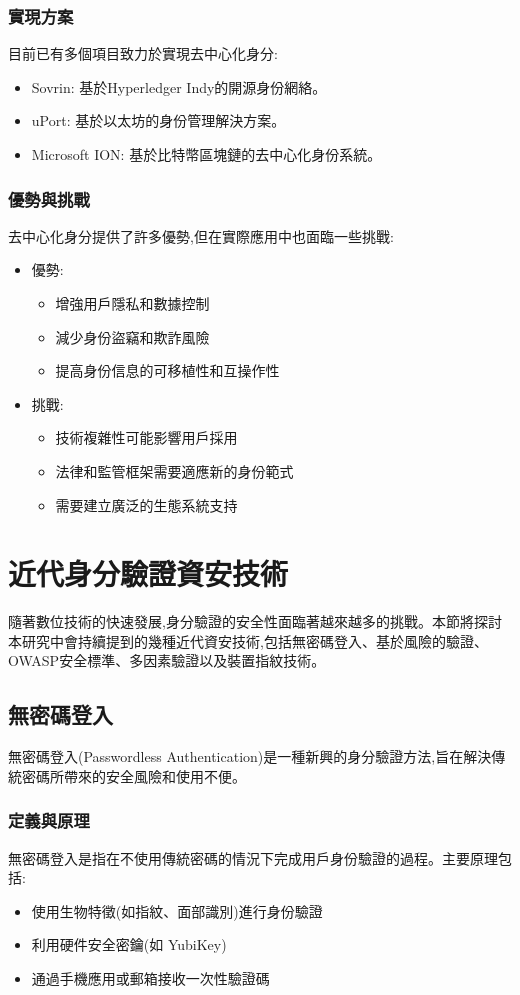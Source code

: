 \subsubsection{實現方案}
目前已有多個項目致力於實現去中心化身分:
\begin{itemize}
  \item Sovrin: 基於Hyperledger Indy的開源身份網絡。
  \item uPort: 基於以太坊的身份管理解決方案。
  \item Microsoft ION: 基於比特幣區塊鏈的去中心化身份系統。
\end{itemize}

\subsubsection{優勢與挑戰}
去中心化身分提供了許多優勢,但在實際應用中也面臨一些挑戰:
\begin{itemize}
  \item 優勢:
        \begin{itemize}
          \item 增強用戶隱私和數據控制
          \item 減少身份盜竊和欺詐風險
          \item 提高身份信息的可移植性和互操作性
        \end{itemize}
  \item 挑戰:
        \begin{itemize}
          \item 技術複雜性可能影響用戶採用
          \item 法律和監管框架需要適應新的身份範式
          \item 需要建立廣泛的生態系統支持
        \end{itemize}
\end{itemize}


\section{近代身分驗證資安技術}
隨著數位技術的快速發展,身分驗證的安全性面臨著越來越多的挑戰。本節將探討本研究中會持續提到的幾種近代資安技術,包括無密碼登入、基於風險的驗證、OWASP安全標準、多因素驗證以及裝置指紋技術。
\subsection{無密碼登入}
無密碼登入(Passwordless Authentication)是一種新興的身分驗證方法,旨在解決傳統密碼所帶來的安全風險和使用不便。
\subsubsection{定義與原理}
無密碼登入是指在不使用傳統密碼的情況下完成用戶身份驗證的過程。主要原理包括:
\begin{itemize}
  \item 使用生物特徵(如指紋、面部識別)進行身份驗證
  \item 利用硬件安全密鑰(如 YubiKey)
  \item 通過手機應用或郵箱接收一次性驗證碼
\end{itemize}

